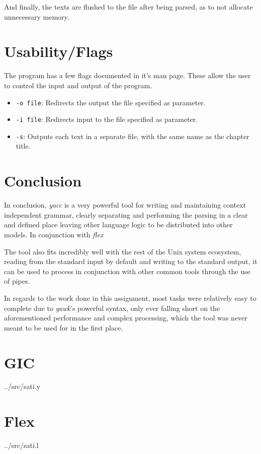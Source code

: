 \documentclass[a4paper]{report}
\begin{document}
And finally, the texts are flushed to the file after being parsed, as to not
allocate unnecessary memory.

\chapter{Usability/Flags}\label{cha:flags}

The program has a few flags documented in it's man page. These allow the user
to control the input and output of the program.

\begin{itemize}
    \item \texttt{-o file}: Redirects the output the file specified as
        parameter.
    \item \texttt{-i file}: Redirects input to the file specified as parameter.
    \item \texttt{-s}: Outputs each text in a separate file, with the same name
        as the chapter title.
\end{itemize}

\chapter{Conclusion}

In conclusion, \textit{yacc} is a very powerful tool for writing and
maintaining context independent grammar, clearly separating and performing the
parsing in a clear and defined place leaving other language logic to be
distributed into other models. In conjunction with \textit{flex}

The tool also fits incredibly well with the rest of the Unix system ecosystem,
reading from the standard input by default and writing to the standard output,
it can be used to process in conjunction with other common tools through the
use of pipes.

In regards to the work done in this assignment, most tasks were relatively easy
to complete due to \textit{gawk}'s powerful syntax, only ever falling short on
the aforementioned performance and complex processing, which the tool was
never meant to be used for in the first place.

\appendix

\chapter{GIC}


{../src/sati.y}

\chapter{Flex}


{../src/sati.l}
\end{document}
